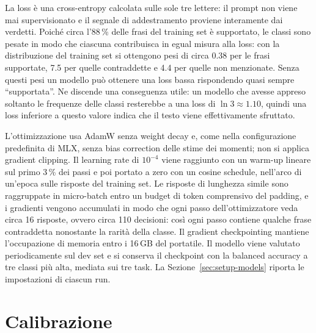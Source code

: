 La loss è una cross-entropy calcolata sulle sole tre lettere: il prompt non viene mai supervisionato e il segnale di
addestramento proviene interamente dai verdetti. Poiché circa l'88\,\% delle frasi del training set è supportato, le
classi sono pesate in modo che ciascuna contribuisca in egual misura alla loss: con la distribuzione del training set
si ottengono pesi di circa 0.38 per le frasi supportate, 7.5 per quelle contraddette e 4.4 per quelle non menzionate.
Senza questi pesi un modello può ottenere una loss bassa rispondendo quasi sempre ``supportata''. Ne discende una
conseguenza utile: un modello che avesse appreso soltanto le frequenze delle classi resterebbe a una loss di
$\ln 3 \approx 1.10$, quindi una loss inferiore a questo valore indica che il testo viene effettivamente sfruttato.

L'ottimizzazione usa AdamW senza weight decay e, come nella configurazione predefinita di MLX, senza bias correction
delle stime dei momenti; non si applica gradient clipping. Il learning rate di $10^{-4}$ viene raggiunto con un warm-up
lineare sul primo 3\,\% dei passi e poi portato a zero con un cosine schedule, nell'arco di un'epoca sulle risposte del
training set. Le risposte di lunghezza simile sono raggruppate in micro-batch entro un budget di token comprensivo del
padding, e i gradienti vengono accumulati in modo che ogni passo dell'ottimizzatore veda circa 16 risposte, ovvero
circa 110 decisioni: così ogni passo contiene qualche frase contraddetta nonostante la rarità della classe. Il gradient
checkpointing mantiene l'occupazione di memoria entro i 16\,GB del portatile. Il modello viene valutato periodicamente
sul dev set e si conserva il checkpoint con la balanced accuracy a tre classi più alta, mediata sui tre task. La
Sezione~\ref{sec:setup-models} riporta le impostazioni di ciascun run.

\section{Calibrazione}
\label{sec:method-calibration}

